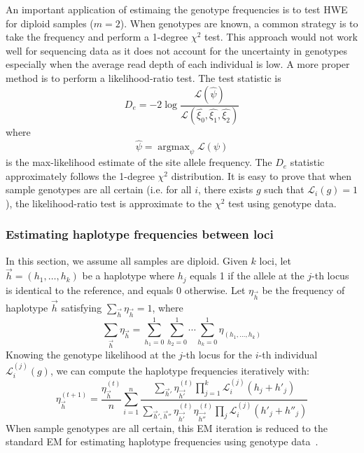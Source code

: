 \documentclass{bioinfo}
\DeclareMathOperator*{\argmax}{argmax}
\begin{document}
\begin{methods}
An important application of estimaing the genotype frequencies is to test HWE
for diploid samples ($m=2$).  When genotypes are known, a common strategy is to
take the frequency and perform a 1-degree $\chi^2$ test. This approach would
not work well for sequencing data as it does not account for the uncertainty in
genotypes especially when the average read depth of each individual is low. A
more proper method is to perform a likelihood-ratio test. The test statistic is
\begin{equation}\label{eq:hwe}
D_e=-2\log\frac{\mathcal{L}(\hat{\psi})}{\mathcal{L}(\hat{\xi_0},\hat{\xi_1},\hat{\xi_2})}
\end{equation}
where
\begin{equation}\label{eq:psimax}
\hat{\psi}=\argmax_{\psi}\mathcal{L}(\psi)
\end{equation}
is the max-likelihood estimate of the site allele frequency.  The $D_e$
statistic approximately follows the 1-degree $\chi^2$ distribution.  It is easy
to prove that when sample genotypes are all certain (i.e. for all $i$, there
exists $g$ such that $\mathcal{L}_i(g)=1$), the likelihood-ratio test is
approximate to the $\chi^2$ test using genotype data.

\subsubsection{Estimating haplotype frequencies between loci}
In this section, we assume all samples are diploid. Given $k$ loci, let
$\vec{h}=(h_1,\ldots,h_k)$ be a haplotype where $h_j$ equals 1 if the allele at
the $j$-th locus is identical to the reference, and equals 0 otherwise.  Let
$\eta_{\vec{h}}$ be the frequency of haplotype $\vec{h}$ satisfying
$\sum_{\vec{h}}\eta_{\vec{h}}=1$, where
$$
\sum_{\vec{h}}\eta_{\vec{h}}=\sum_{h_1=0}^1\sum_{h_2=0}^1\cdots\sum_{h_k=0}^1\eta_{(h_1,\ldots,h_k)}
$$
Knowing the genotype likelihood at the $j$-th locus for the $i$-th individual
$\mathcal{L}^{(j)}_i(g)$, we can compute the haplotype frequencies iteratively
with:
\begin{equation}\label{equ:hf}
\eta^{(t+1)}_{\vec{h}}=\frac{\eta_{\vec{h}}^{(t)}}{n}\sum_{i=1}^n\frac{\sum_{\vec{h}'}\eta_{\vec{h'}}^{(t)}\prod_{j=1}^k\mathcal{L}^{(j)}_i(h_j+h'_j)}
{\sum_{\vec{h}',\vec{h}''}\eta_{\vec{h'}}^{(t)}\eta_{\vec{h''}}^{(t)}\prod_{j}\mathcal{L}^{(j)}_i(h'_j+h''_j)}
\end{equation}
When sample genotypes are all certain, this EM iteration is reduced to the
standard EM for estimating haplotype frequencies using genotype
data~\citep{Excoffier:1995ly}.


\end{methods}
\end{document}
